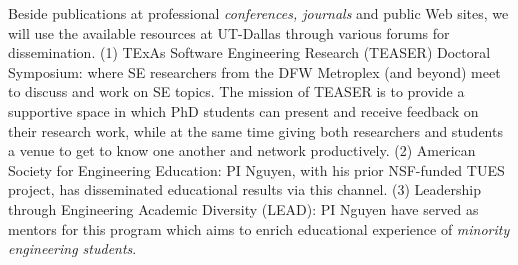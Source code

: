 Beside publications at professional \emph{conferences, journals} and
public Web sites, we will use the available resources at UT-Dallas
through various forums for dissemination.
%
(1) TExAs Software Engineering Research (TEASER) Doctoral Symposium:
where SE researchers from the DFW Metroplex (and beyond) meet to
discuss and work on SE topics.  The mission of TEASER is to provide a
supportive space in which PhD students can present and receive
feedback on their research work, while at the same time giving both
researchers and students a venue to get to know one another and
network productively.  (2) American Society for Engineering Education:
PI Nguyen, with his prior NSF-funded TUES project, has disseminated
educational results via this channel.
(3) Leadership through Engineering Academic Diversity (LEAD): PI
Nguyen have served as mentors for this program which aims to enrich
educational experience of {\em minority engineering students}.


